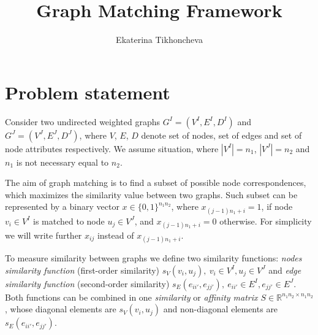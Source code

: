 \documentclass[
	fontsize=12pt,
	paper=a4,
	twoside=false,
	numbers=noenddot,
	plainheadsepline,
	toc=listof,
	toc=bibliography
]{scrartcl}
\begin{document}
\pagestyle{plain}

\title{Graph Matching Framework}
\author{Ekaterina Tikhoncheva}
\date{} 

\maketitle 

%

\section{Problem statement} \label{sec:prob_stat}
Consider two undirected weighted graphs $G^I = (V^I, E^I, D^I)$ and $G^J = (V^J, E^J, D^J)$, where $V$, $E$, $D$ denote set of nodes,
set of edges and set of node attributes respectively. We assume situation, where $|V^I|=n_1$, $|V^J|=n_2$ and $n_1$ is not necessary equal to $n_2$.

The aim of graph matching is to find a subset of possible node correspondences, which maximizes the similarity value between two graphs. Such subset can be represented by a binary vector $x\in \{0,1\}^{n_1n_2}$, where $x_{(j-1)n_1+i}=1$, if node $v_i\in V^I$ is matched to node $u_j\in V^J$, and $x_{(j-1)n_1+i}=0$ otherwise. For simplicity we will write further $x_{ij}$ instead of $x_{(j-1)n_1+i}$.

To measure similarity between graphs we define two similarity functions: \emph{nodes similarity function} (first-order similarity) $s_V(v_i, u_j),\ v_i\in V^I, u_j\in V^J$ and \emph{edge similarity function} (second-order similarity) $s_E(e_{ii\prime}, e_{jj\prime}),\ e_{ii\prime}\in E^I, e_{jj\prime}\in E^J$. Both functions can be combined in one \emph{similarity} or \emph{affinity matrix $S\in\mathbb{R}^{n_1n_2\times n_1n_2}$}, whose diagonal elements are $s_V(v_i, u_j)$ and non-diagonal elements are $s_E(e_{ii\prime}, e_{jj\prime})$.
\end{document}
